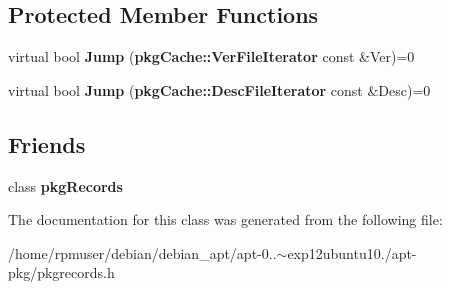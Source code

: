 \subsection*{\-Protected \-Member \-Functions}
\begin{DoxyCompactItemize}
\item 
virtual bool {\bfseries \-Jump} ({\bf pkg\-Cache\-::\-Ver\-File\-Iterator} const \&\-Ver)=0\label{classpkgRecords_1_1Parser_a9f0c1e8ff44907dc3be122ec79a9b065}

\item 
virtual bool {\bfseries \-Jump} ({\bf pkg\-Cache\-::\-Desc\-File\-Iterator} const \&\-Desc)=0\label{classpkgRecords_1_1Parser_a89cc4b15a6c632606210959abe4e5616}

\end{DoxyCompactItemize}
\subsection*{\-Friends}
\begin{DoxyCompactItemize}
\item 
class {\bfseries pkg\-Records}\label{classpkgRecords_1_1Parser_a6b8e28f8652e835e8991366a1897d061}

\end{DoxyCompactItemize}


\-The documentation for this class was generated from the following file\-:\begin{DoxyCompactItemize}
\item 
/home/rpmuser/debian/debian\-\_\-apt/apt-\/0..$\sim$exp12ubuntu10./apt-\/pkg/pkgrecords.\-h\end{DoxyCompactItemize}
